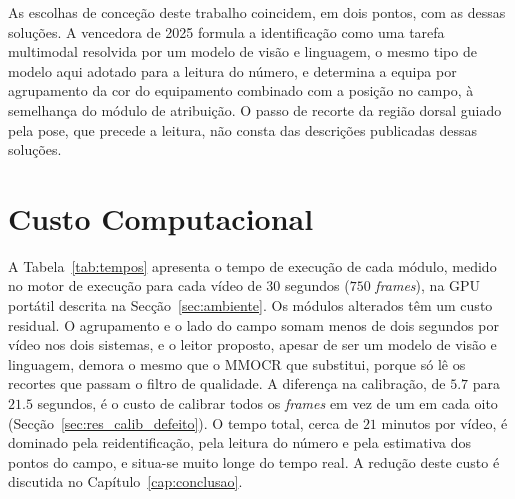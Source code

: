 As escolhas de conceção deste trabalho coincidem, em dois pontos, com as dessas soluções. A
vencedora de 2025 formula a identificação como uma tarefa multimodal resolvida por um modelo de
visão e linguagem, o mesmo tipo de modelo aqui adotado para a leitura do número, e determina a
equipa por agrupamento da cor do equipamento combinado com a posição no campo, à semelhança do
módulo de atribuição. O passo de recorte da região dorsal guiado pela pose, que precede a leitura,
não consta das descrições publicadas dessas soluções.

\section{Custo Computacional}\label{sec:res_tempos}

A Tabela~\ref{tab:tempos} apresenta o tempo de execução de cada módulo, medido no motor de execução
para cada vídeo de $30$ segundos ($750$ \emph{frames}), na GPU portátil descrita na
Secção~\ref{sec:ambiente}. Os módulos alterados têm um custo residual. O agrupamento e o lado do
campo somam menos de dois segundos por vídeo nos dois sistemas, e o leitor proposto, apesar de ser
um modelo de visão e linguagem, demora o mesmo que o MMOCR que substitui, porque só lê os recortes
que passam o filtro de qualidade. A diferença na calibração, de $5.7$ para $21.5$ segundos, é o custo
de calibrar todos os \emph{frames} em vez de um em cada oito (Secção~\ref{sec:res_calib_defeito}).
O tempo total, cerca de $21$ minutos por vídeo, é dominado pela reidentificação, pela leitura do
número e pela estimativa dos pontos do campo, e situa-se muito longe do tempo real. A redução deste
custo é discutida no Capítulo~\ref{cap:conclusao}.


